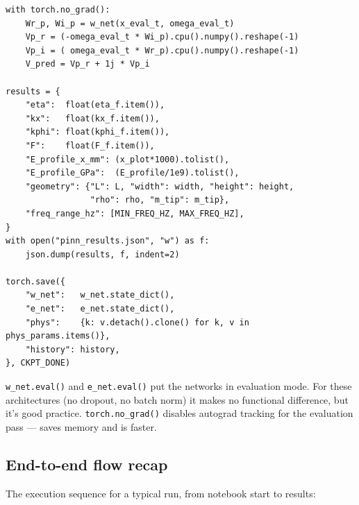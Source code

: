 \documentclass[11pt,a4paper]{article}
\begin{document}
\begin{lstlisting}[caption={Predicting the FRF and saving results}]
with torch.no_grad():
    Wr_p, Wi_p = w_net(x_eval_t, omega_eval_t)
    Vp_r = (-omega_eval_t * Wi_p).cpu().numpy().reshape(-1)
    Vp_i = ( omega_eval_t * Wr_p).cpu().numpy().reshape(-1)
    V_pred = Vp_r + 1j * Vp_i

results = {
    "eta":  float(eta_f.item()),
    "kx":   float(kx_f.item()),
    "kphi": float(kphi_f.item()),
    "F":    float(F_f.item()),
    "E_profile_x_mm": (x_plot*1000).tolist(),
    "E_profile_GPa":  (E_profile/1e9).tolist(),
    "geometry": {"L": L, "width": width, "height": height,
                 "rho": rho, "m_tip": m_tip},
    "freq_range_hz": [MIN_FREQ_HZ, MAX_FREQ_HZ],
}
with open("pinn_results.json", "w") as f:
    json.dump(results, f, indent=2)

torch.save({
    "w_net":   w_net.state_dict(),
    "e_net":   e_net.state_dict(),
    "phys":    {k: v.detach().clone() for k, v in phys_params.items()},
    "history": history,
}, CKPT_DONE)
\end{lstlisting}

\texttt{w\_net.eval()} and \texttt{e\_net.eval()} put the networks in evaluation mode. For these architectures (no dropout, no batch norm) it makes no functional difference, but it's good practice. \texttt{torch.no\_grad()} disables autograd tracking for the evaluation pass --- saves memory and is faster.

\subsection{End-to-end flow recap}

The execution sequence for a typical run, from notebook start to results:
\end{document}
